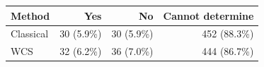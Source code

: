 \begin{tabular}{lrrr}
\toprule
Method & Yes & No & Cannot determine \\ 
\midrule
Classical & 30 (5.9\%) & 30 (5.9\%) & 452 (88.3\%) \\
WCS & 32 (6.2\%) & 36 (7.0\%) & 444 (86.7\%) \\
\bottomrule
\end{tabular}
